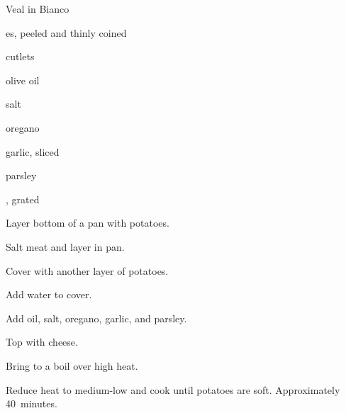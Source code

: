 \begin{recipe}{Veal in Bianco}{}{}

\begin{ingredients}
\item {}es, peeled and thinly coined
\item {} cutlets
\item olive oil
\item salt
\item oregano
\item garlic, sliced
\item parsley
\item {}, grated
\end{ingredients}

\begin{directions}
\item Layer bottom of a pan with potatoes.
\item Salt meat and layer in pan.
\item Cover with another layer of potatoes.
\item Add water to cover.
\item Add oil, salt, oregano, garlic, and parsley.
\item Top with cheese.
\item Bring to a boil over high heat.
\item Reduce heat to medium-low and cook until potatoes are soft. Approximately 40~minutes.
\end{directions}

\end{recipe}

